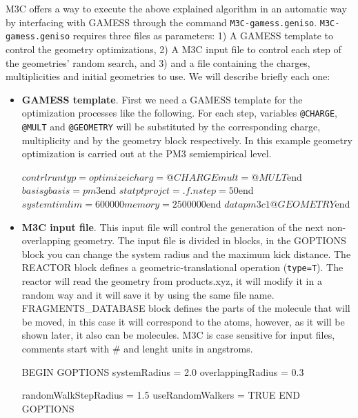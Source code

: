\documentclass[a4paper,12pt]{article}
\begin{document}
M3C offers a way to execute the above explained algorithm in an automatic way by interfacing with GAMESS through the command \texttt{M3C-gamess.geniso}.
\texttt{M3C-gamess.geniso} requires three files as parameters: 1) A GAMESS template to control the geometry optimizations, 2) A M3C input file
to control each step of the geometries' random search, and 3) and a file containing the charges, multiplicities and initial geometries to use.
We will describe briefly each one:

\begin{itemize}

\item
\textbf{GAMESS template}.
First we need a GAMESS template for the optimization processes like the following. For each step, variables \texttt{@CHARGE}, \texttt{@MULT} and 
\texttt{@GEOMETRY} will be substituted by the corresponding charge, multiplicity and by the geometry block respectively.
In this example geometry optimization is carried out at the PM3 semiempirical level.

\begin{bifile}[caption=\footnotesize GAMESS template for geometry optimization at PM3 level (pm3.optg-GAMESS.inp)]
 $contrl runtyp=optimize icharg=@CHARGE mult=@MULT $end
 $basis gbasis=pm3 $end
 $statpt projct=.f. nstep=50 $end
 $system timlim=600000 memory=2500000 $end
 $data
 pm3
 c1
 @GEOMETRY
 $end
\end{bifile}

\item
\textbf{M3C input file}.
This input file will control the generation of the next non-overlapping geometry.
The input file is divided in blocks, in the GOPTIONS block you can change the system radius and the maximum kick distance. The REACTOR block defines a 
geometric-translational operation (\texttt{type=T}). The reactor will read the geometry from products.xyz, it will modify it in a random way and it will save 
it by using the same file name. FRAGMENTS\_DATABASE block defines the parts of the molecule that will be moved, in this case it will correspond to the atoms, 
however, as it will be shown later, it also can be molecules. M3C is case sensitive for input files, comments start with \# and lenght units in angstroms.

\begin{bifile}[caption=\footnotesize M3C input file for random walker algorithm (reactorT.m3c)]
BEGIN GOPTIONS
        systemRadius = 2.0
        overlappingRadius = 0.3
        
        randomWalkStepRadius = 1.5
        useRandomWalkers = TRUE
END GOPTIONS


\end{bifile}
\end{itemize}
\end{document}
